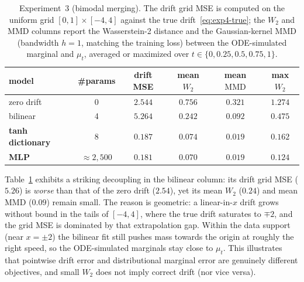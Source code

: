 \documentclass[11pt,leqno]{article}
\theoremstyle{plain}
\theoremstyle{remark}
\theoremstyle{definition}
\numberwithin{equation}{section}
\numberwithin{figure}{section}
\numberwithin{table}{section}
\begin{document}
\begin{table}[htbp]
\centering
\begin{tabular}{lccccc}
\toprule
model & \#params & drift MSE & mean $W_2$ & mean $\mathrm{MMD}$ & max $W_2$ \\
\midrule
zero drift                 & 0                 & $2.544$ & $0.756$ & $0.321$ & $1.274$ \\
bilinear                   & 4                 & $5.264$ & $0.242$ & $0.092$ & $0.475$ \\
\textbf{tanh dictionary}   & 8                 & $\mathbf{0.187}$ & $\mathbf{0.074}$ & $\mathbf{0.019}$ & $\mathbf{0.162}$ \\
\textbf{MLP}               & $\approx 2{,}500$ & $\mathbf{0.181}$ & $\mathbf{0.070}$ & $\mathbf{0.019}$ & $\mathbf{0.124}$ \\
\bottomrule
\end{tabular}
\caption{Experiment~3 (bimodal merging).  The drift grid MSE is
computed on the uniform grid $[0,1]\times[-4,4]$ against the true
drift~\eqref{eq:exp4-true}; the $W_2$ and $\mathrm{MMD}$ columns report
the Wasserstein-2 distance and the Gaussian-kernel MMD (bandwidth
$h=1$, matching the training loss) between the ODE-simulated marginal
and $\mu_t$, averaged or maximized over $t\in\{0,0.25,0.5,0.75,1\}$.}
\label{tab:exp4}
\end{table}


Table~\ref{tab:exp4} exhibits a striking decoupling in the bilinear
column: its drift grid MSE ($5.26$) is \emph{worse} than that of
the zero drift ($2.54$), yet its mean $W_2$ ($0.24$) and mean
$\mathrm{MMD}$ ($0.09$) remain small.  The reason is geometric: a
linear-in-$x$ drift grows without bound in the tails of $[-4,4]$,
where the true drift saturates to $\mp 2$, and the grid MSE is
dominated by that extrapolation gap.  Within the data support (near
$x=\pm 2$) the bilinear fit still pushes mass towards the origin at
roughly the right speed, so the ODE-simulated marginals stay close to
$\mu_t$.  This illustrates that pointwise drift error and
distributional marginal error are genuinely different objectives, and
small $W_2$ does not imply correct drift (nor vice versa).
\end{document}
